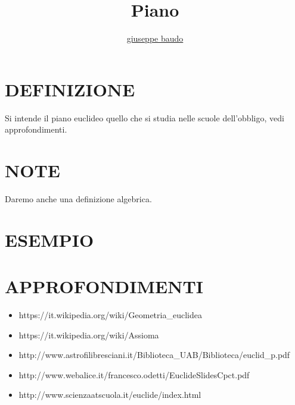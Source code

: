 \documentclass[a4paper,10pt]{article}
\title{Piano}
\author{\href{http://www.baudo.hol.es}{giuseppe baudo}}
\begin{document}
\maketitle

\section{DEFINIZIONE}
Si intende il piano euclideo quello che si studia nelle scuole dell'obbligo, vedi approfondimenti.

\section{NOTE}
Daremo anche una definizione algebrica.

\section{ESEMPIO}

\section{APPROFONDIMENTI}
\begin{itemize}
 \item https://it.wikipedia.org/wiki/Geometria_euclidea
 \item https://it.wikipedia.org/wiki/Assioma
 \item http://www.astrofilibresciani.it/Biblioteca_UAB/Biblioteca/euclid_p.pdf
 \item http://www.webalice.it/francesco.odetti/EuclideSlidesCpct.pdf
 \item http://www.scienzaatscuola.it/euclide/index.html
\end{itemize}
\end{document}
